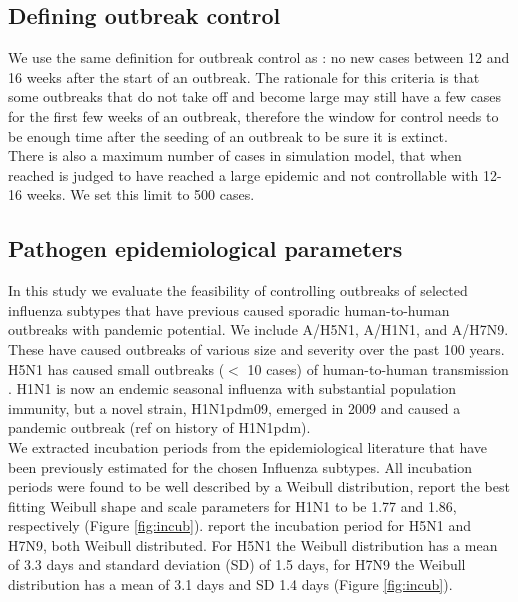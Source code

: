\documentclass{article}
\begin{document}
\subsection*{Defining outbreak control}

We use the same definition for outbreak control as \cite{hellewellFeasibilityControllingCOVID192020}: no new cases between 12 and 16 weeks after the start of an outbreak. The rationale for this criteria is that some outbreaks that do not take off and become large may still have a few cases for the first few weeks of an outbreak, therefore the window for control needs to be enough time after the seeding of an outbreak to be sure it is extinct. \\

There is also a maximum number of cases in simulation model, that when reached is judged to have reached a large epidemic and not controllable with 12-16 weeks. We set this limit to 500 cases.

\subsection*{Pathogen epidemiological parameters} \label{epiparameters}

In this study we evaluate the feasibility of controlling outbreaks of selected influenza subtypes that have previous caused sporadic human-to-human outbreaks with pandemic potential. We include A/H5N1, A/H1N1, and A/H7N9. These have caused outbreaks of various size and severity over the past 100 years. H5N1 has caused small outbreaks ($<$ 10 cases) of human-to-human transmission \citep{yangDetectingHumanhumanTransmission2007a, aditamaAvianInfluenzaH5N12012a}. H1N1 is now an endemic seasonal influenza with substantial population immunity, but a novel strain, H1N1pdm09, emerged in 2009 and caused a pandemic outbreak \citep{fraserPandemicPotentialStrain2009, lesslerOutbreak2009Pandemic2009} (ref on history of H1N1pdm). \\

We extracted incubation periods from the epidemiological literature that have been previously estimated for the chosen Influenza subtypes. All incubation periods were found to be well described by a Weibull distribution, \cite{nishiuraEstimationIncubationPeriod2011} report the best fitting Weibull shape and scale parameters for H1N1 to be 1.77 and 1.86, respectively (Figure \ref{fig:incub}). \cite{cowlingComparativeEpidemiologyHuman2013} report the incubation period for H5N1 and H7N9, both Weibull distributed. For H5N1 the Weibull distribution has a mean of 3.3 days and standard deviation (SD) of 1.5 days, for H7N9 the Weibull distribution has a mean of 3.1 days and SD 1.4 days \citep{cowlingComparativeEpidemiologyHuman2013} (Figure \ref{fig:incub}). \\
\end{document}

